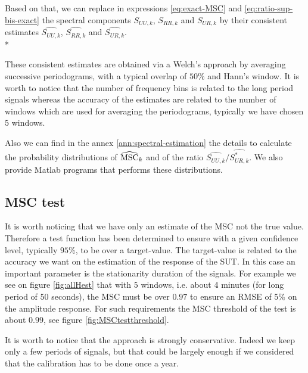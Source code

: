 
Based on that, we can replace in expressions \eqref{eq:exact-MSC} and \eqref{eq:ratio-sup-bis-exact} the spectral components $S_{UU,k}$, $S_{RR,k}$ and $S_{UR,k}$ by their consistent estimates $\widehat{S_{UU,k}}$, $\widehat{S_{RR,k}}$ and $\widehat{S_{UR,k}}$.\\*


These consistent estimates are obtained via a Welch's approach by averaging successive periodograms, with a typical overlap of $50\%$ and Hann's window. It is worth to notice that the number of frequency  bins is related to the long period signals whereas the accuracy of the estimates are related to the number of windows which are used for averaging the periodograms, typically we have chosen $5$ windows. 


Also we can find in the annex \ref{ann:spectral-estimation} the details to calculate the probability distributions of $\widehat{\mathrm{MSC}}_{k}$ and of the ratio $\widehat{S_{UU,k}}/\widehat{S^*_{UR,k}}$. We also provide Matlab programs that performs these distributions. 

\subsection{MSC test}

It is worth noticing that we have only an estimate of the MSC not the true value. Therefore a test function has been determined to ensure with a given confidence level, typically $95\%$, to be over a target-value. The target-value is related to the accuracy we want on the estimation of the response of the SUT. In this case an important parameter is the  stationarity duration of the signals. For example we see on figure \ref{fig:allHest} that with $5$ windows, i.e. about 4 minutes (for long period of 50 seconds), the MSC must be over $0.97$ to ensure an RMSE of 5\% on the amplitude response. For such requirements the MSC threshold of the test is about $0.99$, see figure \ref{fig:MSCtestthreshold}.

It is worth to notice that the approach is strongly conservative. Indeed we keep only a few periods of signals, but that could be largely enough if we considered that the calibration has to be done once a year.



